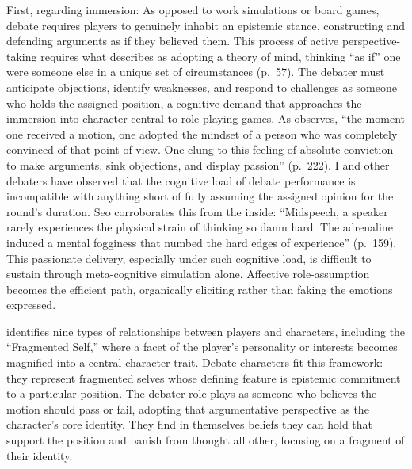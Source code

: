First, regarding immersion: As opposed to work simulations or board games, debate requires players to genuinely inhabit an epistemic stance, constructing and defending arguments as if they believed them. This process of active perspective-taking requires what \textcite{bowman2010functions} describes as adopting a theory of mind, thinking ``as if'' one were someone else in a unique set of circumstances (p.~57). The debater must anticipate objections, identify weaknesses, and respond to challenges as someone who holds the assigned position, a cognitive demand that approaches the immersion into character central to role-playing games. As \textcite{seo2022good} observes, ``the moment one received a motion, one adopted the mindset of a person who was completely convinced of that point of view. One clung to this feeling of absolute conviction to make arguments, sink objections, and display passion'' (p.~222). I and other debaters have observed that the cognitive load of debate performance is incompatible with anything short of fully assuming the assigned opinion for the round's duration. Seo corroborates this from the inside: ``Midspeech, a speaker rarely experiences the physical strain of thinking so damn hard. The adrenaline induced a mental fogginess that numbed the hard edges of experience'' (p.~159). This passionate delivery, especially under such cognitive load, is difficult to sustain through meta-cognitive simulation alone. Affective role-assumption becomes the efficient path, organically eliciting rather than faking the emotions expressed.

\textcite{bowman2010functions} identifies nine types of relationships between players and characters, including the ``Fragmented Self,'' where a facet of the player's personality or interests becomes magnified into a central character trait. Debate characters fit this framework: they represent fragmented selves whose defining feature is epistemic commitment to a particular position. The debater role-plays as someone who believes the motion should pass or fail, adopting that argumentative perspective as the character's core identity. They find in themselves beliefs they can hold that support the position and banish from thought all other, focusing on a fragment of their identity.

